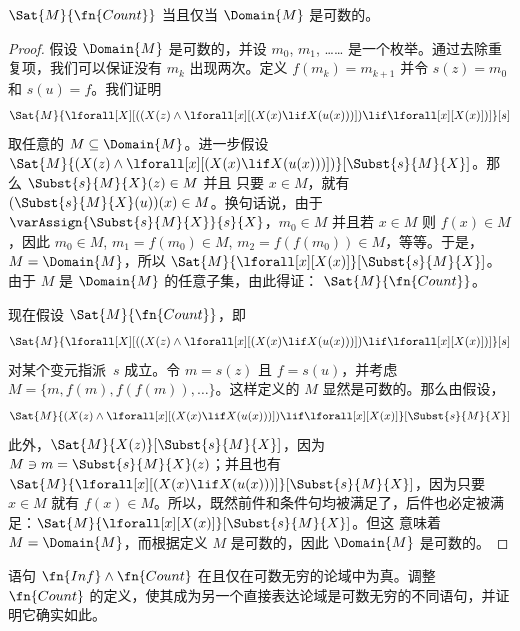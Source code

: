 \documentclass[../../../include/open-logic-section]{subfiles}
\begin{document}
\begin{prop}
$\Sat{M}{\fn{Count}}$ 当且仅当 $\Domain{M}$ 是可数的。
\end{prop}

\begin{proof}
假设 $\Domain{M}$ 是可数的，并设 $m_0$, $m_1$, …… 是一个枚举。通过去除重复项，我们可以保证没有 $m_k$ 出现两次。定义 $f(m_k) = m_{k+1}$ 并令 $s(z) = m_0$ 和 $s(u) = f$。我们证明
\[
\Sat{M}{\lforall[X][((X(z) \land \lforall[x][(X(x) \lif X(u(x)))])
    \lif \lforall[x][X(x)])]}[s]
\]
取任意的 $M \subseteq \Domain{M}$。进一步假设
$\Sat{M}{(X(z) \land \lforall[x][(X(x) \lif
X(u(x)))])}[\Subst{s}{M}{X}]$。那么 $\Subst{s}{M}{X}(z) \in M$ 并且
只要 $x \in M$，就有 $(\Subst{s}{M}{X}(u))(x) \in M$。换句话说，由于 $\varAssign{\Subst{s}{M}{X}}{s}{X}$，$m_0 \in M$ 并且若
$x \in M$ 则 $f(x) \in M$，因此 $m_0 \in M$, $m_1 = f(m_0) \in M$,
$m_2 = f(f(m_0)) \in M$，等等。于是，$M = \Domain{M}$，所以
$\Sat{M}{\lforall[x][X(x)]}[\Subst{s}{M}{X}]$。由于 $M$ 是 $\Domain{M}$ 的任意子集，由此得证：
$\Sat{M}{\fn{Count}}$。

现在假设 $\Sat{M}{\fn{Count}}$，即
\[
\Sat{M}{\lforall[X][((X(z) \land \lforall[x][(X(x) \lif X(u(x)))])
    \lif \lforall[x][X(x)])]}[s]
\]
对某个变元指派~$s$ 成立。令 $m = s(z)$ 且 $f = s(u)$，并考虑 $M = \{m,
f(m), f(f(m)), \dots\}$。这样定义的 $M$ 显然是可数的。那么由假设，
\[
\Sat{M}{(X(z) \land \lforall[x][(X(x) \lif X(u(x)))])
    \lif \lforall[x][X(x)]}[\Subst{s}{M}{X}]
\]
此外，$\Sat{M}{X(z)}[\Subst{s}{M}{X}]$，因为 $M \ni m =
\Subst{s}{M}{X}(z)$；并且也有 $\Sat{M}{\lforall[x][(X(x) \lif
X(u(x)))]}[\Subst{s}{M}{X}]$，因为只要 $x \in M$ 就有 $f(x) \in
M$。所以，既然前件和条件句均被满足了，后件也必定被满足：$\Sat{M}{\lforall[x][X(x)]}[\Subst{s}{M}{X}]$。但这
意味着 $M = \Domain{M}$，而根据定义 $M$ 是可数的，因此 $\Domain{M}$ 是可数的。
\end{proof}

\begin{prob}
语句 $\fn{Inf} \land \fn{Count}$ 在且仅在可数无穷的论域中为真。调整 $\fn{Count}$ 的定义，使其成为另一个直接表达论域是可数无穷的不同语句，并证明它确实如此。
\end{prob}
\end{document}
